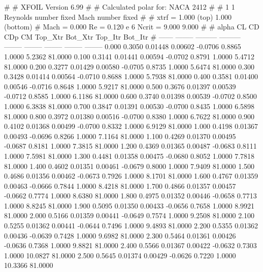#  
#       XFOIL         Version 6.99
#  
# Calculated polar for: NACA 2412                                       
#  
# 1 1 Reynolds number fixed          Mach number fixed         
#  
# xtrf =   1.000 (top)        1.000 (bottom)  
# Mach =   0.000     Re =     0.120 e 6     Ncrit =   9.000  9.000
#  
#   alpha    CL        CD       CDp       CM     Top_Xtr  Bot_Xtr  Top_Itr  Bot_Itr
#  ------ -------- --------- --------- -------- -------- -------- -------- --------
   0.000   0.3050   0.01448   0.00602  -0.0706   0.8865   1.0000   5.2362  81.0000
   0.100   0.3141   0.01441   0.00594  -0.0702   0.8791   1.0000   5.4712  81.0000
   0.200   0.3277   0.01429   0.00580  -0.0705   0.8735   1.0000   5.6474  81.0000
   0.300   0.3428   0.01414   0.00564  -0.0710   0.8688   1.0000   5.7938  81.0000
   0.400   0.3581   0.01400   0.00546  -0.0716   0.8648   1.0000   5.9217  81.0000
   0.500   0.3676   0.01397   0.00539  -0.0712   0.8585   1.0000   6.1186  81.0000
   0.600   0.3740   0.01398   0.00539  -0.0702   0.8500   1.0000   6.3838  81.0000
   0.700   0.3847   0.01391   0.00530  -0.0700   0.8435   1.0000   6.5898  81.0000
   0.800   0.3972   0.01380   0.00516  -0.0700   0.8380   1.0000   6.7622  81.0000
   0.900   0.4102   0.01368   0.00499  -0.0700   0.8332   1.0000   6.9129  81.0000
   1.000   0.4198   0.01367   0.00493  -0.0696   0.8266   1.0000   7.1164  81.0000
   1.100   0.4269   0.01370   0.00495  -0.0687   0.8181   1.0000   7.3815  81.0000
   1.200   0.4369   0.01365   0.00487  -0.0683   0.8111   1.0000   7.5981  81.0000
   1.300   0.4481   0.01358   0.00475  -0.0680   0.8052   1.0000   7.7818  81.0000
   1.400   0.4602   0.01351   0.00461  -0.0679   0.8000   1.0000   7.9409  81.0000
   1.500   0.4686   0.01356   0.00462  -0.0673   0.7926   1.0000   8.1701  81.0000
   1.600   0.4767   0.01359   0.00463  -0.0666   0.7844   1.0000   8.4218  81.0000
   1.700   0.4866   0.01357   0.00457  -0.0662   0.7774   1.0000   8.6380  81.0000
   1.800   0.4975   0.01352   0.00446  -0.0658   0.7713   1.0000   8.8245  81.0000
   1.900   0.5095   0.01350   0.00433  -0.0656   0.7658   1.0000   8.9921  81.0000
   2.000   0.5166   0.01359   0.00441  -0.0649   0.7574   1.0000   9.2508  81.0000
   2.100   0.5255   0.01362   0.00441  -0.0644   0.7496   1.0000   9.4893  81.0000
   2.200   0.5355   0.01362   0.00436  -0.0639   0.7428   1.0000   9.6982  81.0000
   2.300   0.5464   0.01361   0.00426  -0.0636   0.7368   1.0000   9.8821  81.0000
   2.400   0.5566   0.01367   0.00422  -0.0632   0.7303   1.0000  10.0827  81.0000
   2.500   0.5645   0.01374   0.00429  -0.0626   0.7220   1.0000  10.3366  81.0000
